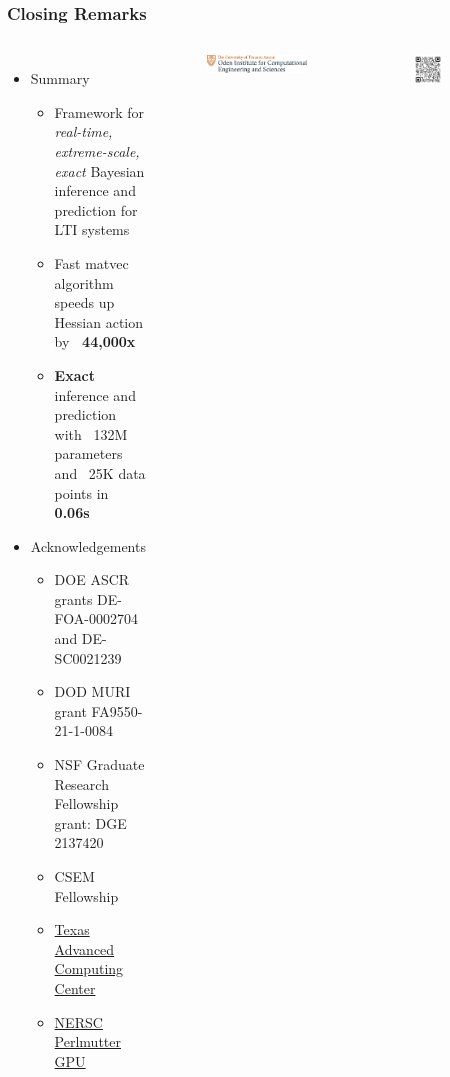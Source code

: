 \begin{frame}
    \frametitle{Closing Remarks}
    \begin{columns}
        \begin{itemize}
            \item Summary
            \begin{itemize}
                \item Framework for \emph{real-time, extreme-scale, exact} Bayesian inference and prediction for LTI systems
                \item Fast matvec algorithm speeds up Hessian action by \textbf{~44,000x}
                \item \textbf{Exact} inference and prediction with ~132M parameters and ~25K data points in \textbf{0.06s}
            \end{itemize}
            \item Acknowledgements
            \begin{itemize}
                \item DOE ASCR grants DE-FOA-0002704 and DE-SC0021239
                \item DOD MURI grant FA9550-21-1-0084
                \item NSF Graduate Research Fellowship grant: DGE 2137420
                \item CSEM Fellowship
                \item \href{https://tacc.utexas.edu/}{Texas Advanced Computing Center}
                \item \href{https://docs.nersc.gov/systems/perlmutter/architecture/}{NERSC Perlmutter GPU}
            \end{itemize}
        \end{itemize}
        \begin{figure}
            \centering
            \includegraphics[width=0.95\textwidth]{siam_pp_24/Oden-logo-cropped.svg}
        \end{figure}
        \begin{figure}
            \centering
            \includegraphics[width=0.5\textwidth]{JMM/images/misc/qr_jmm.svg}

\end{figure}
\end{columns}
\end{frame}
